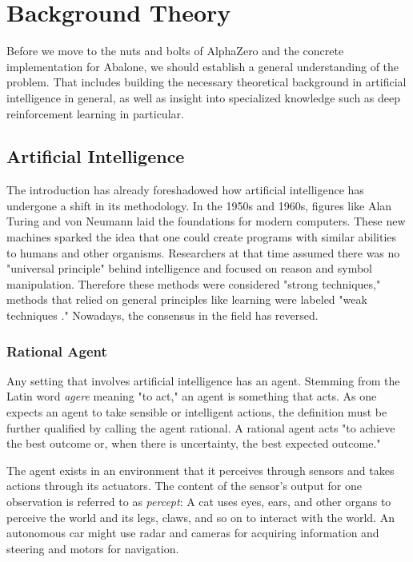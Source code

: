 \chapter{Background Theory}
\label{background-theory}
Before we move to the nuts and bolts of AlphaZero and the concrete implementation for Abalone, we should establish a general understanding of the problem. That includes building the necessary theoretical background in artificial intelligence in general, as well as insight into specialized knowledge such as deep reinforcement learning in particular.

\section{Artificial Intelligence}
The introduction has already foreshadowed how artificial intelligence has undergone a shift in its methodology. In the 1950s and 1960s, figures like Alan Turing and von Neumann laid the foundations for modern computers. These new machines sparked the idea that one could create programs with similar abilities to humans and other organisms. Researchers at that time assumed there was no "universal principle" behind intelligence and focused on reason and symbol manipulation. Therefore these methods were considered "strong techniques," methods that relied on general principles like learning were labeled "weak techniques ." Nowadays, the consensus in the field has reversed. \cite[cf. p. 8f.]{sutton_reinforcement_2018}


\subsection{Rational Agent}
Any setting that involves artificial intelligence has an agent. Stemming from the Latin word \textit{agere} meaning "to act," an agent is something that acts. As one expects an agent to take sensible or intelligent actions, the definition must be further qualified by calling the agent rational. A rational agent acts "to achieve the best outcome or, when there is uncertainty, the best expected outcome." \cite[p. 36]{russell_artificial_2021}

The agent exists in an environment that it perceives through sensors and takes actions through its actuators. The content of the sensor's output for one observation is referred to as \textit{percept}: A cat uses eyes, ears, and other organs to perceive the world and its legs, claws, and so on to interact with the world. An autonomous car might use radar and cameras for acquiring information and steering and motors for navigation.

